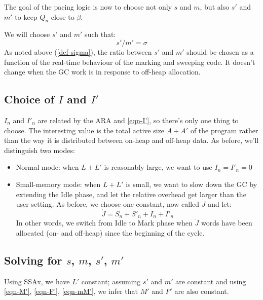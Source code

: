 \documentclass{article}
\begin{document}
The goal of the pacing logic is now to choose not only $s$ and $m$,
but also $s'$ and $m'$ to keep $\dot{Q}_n$ close to $\beta$.

We will choose $s'$ and $m'$ such that:
\begin{equation}\label{sigma-prime}
s' / m' = \sigma
\end{equation}
As noted above (\eqref{def-sigma}), the ratio between $s'$ and $m'$
should be chosen as a function of the real-time behaviour of the
marking and sweeping code. It doesn't change when the GC work is in
response to off-heap allocation.

\subsection[Choice of I and I']{Choice of $I$ and $I'$}

$I_n$ and $I'_n$ are related by the ARA and \eqref{eqn-I'}, so there's
only one
thing to choose. The interesting value is the total active size
$A + A'$ of the program rather than the way it is distributed between
on-heap and off-heap data. As before, we'll distinguish two modes:
\begin{itemize}
\item Normal mode: when $L+L'$ is reasonably large, we want to use
$I_n = I'_n = 0$
\item Small-memory mode: when $L+L'$ is small, we want to slow down
the GC by extending the Idle phase, and let the relative overhead get
larger than the user setting. As before, we choose one constant, now
called $\dot{J}$ and let:
\begin{equation}\label{eqn-Jbar}
\dot{J} = S_n + S'_n + I_n + I'_n
\end{equation}
In other words, we switch from Idle to Mark phase when
$\dot{J}$ words have been allocated (on- and off-heap) since the
beginning of the cycle.
\end{itemize}

\subsection[Solving for s, m, s', m']{Solving for $s$, $m$, $s'$, $m'$}

Using SSAx, we have $L'$ constant; assuming $s'$ and $m'$ are constant
and using
\eqref{eqn-M'}, \eqref{eqn-F'}, \eqref{eqn-mM'}, we infer that
$M'$ and $F'$ are also constant.
\end{document}
